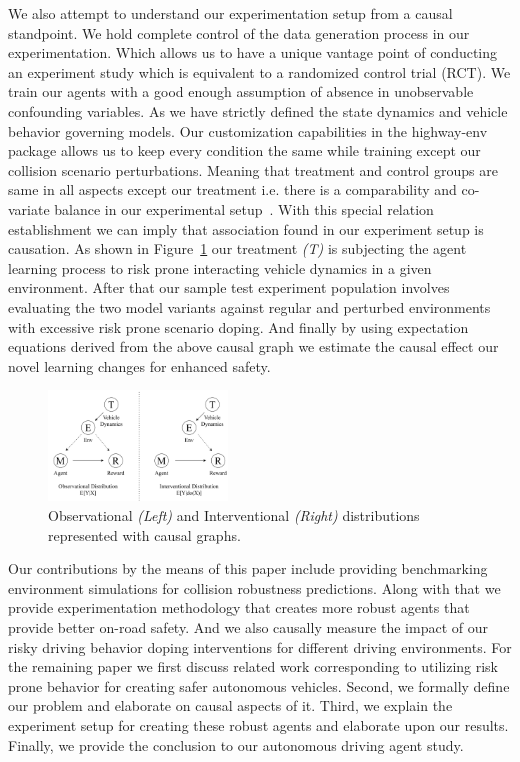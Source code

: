 \documentclass[a4, conference]{IEEEtran}
\begin{document}
    We also attempt to understand our experimentation setup from a causal standpoint. We hold complete control of the data generation process in our experimentation. Which allows us to have a unique vantage point of conducting an experiment study which is equivalent to a randomized control trial (RCT). We train our agents with a good enough assumption of absence in unobservable confounding variables. As we have strictly defined the state dynamics and vehicle behavior governing models. Our customization capabilities in the highway-env package allows us to keep every condition the same while training except our collision scenario perturbations. Meaning that treatment and control groups are same in all aspects except our treatment i.e. there is a comparability and co-variate balance in our experimental setup~\cite{pearl2009causal, pearl2018book, neuberg2003causality, holland1986statistics}. With this special relation establishment we can imply that association found in our experiment setup is causation. As shown in Figure~\ref{fig2} our treatment \textit{(T)} is subjecting the agent learning process to risk prone interacting vehicle dynamics in a given environment. After that our sample test experiment population involves evaluating the two model variants against regular and perturbed environments with excessive risk prone scenario doping. And finally by using expectation equations derived from the above causal graph we estimate the causal effect our novel learning changes for enhanced safety.

    \begin{figure}
        \centering
        \includegraphics[width=0.425\textwidth]{causal-graph-base.png}
        \caption{Observational \textit{(Left)} and Interventional \textit{(Right)} distributions represented with causal graphs.}
        \label{fig2}
    \end{figure}

    Our contributions by the means of this paper include providing benchmarking environment simulations for collision robustness predictions. Along with that we provide experimentation methodology that creates more robust agents that provide better on-road safety. And we also causally measure the impact of our risky driving behavior doping interventions for different driving environments. For the remaining paper we first discuss related work corresponding to utilizing risk prone behavior for creating safer autonomous vehicles. Second, we formally define our problem and elaborate on causal aspects of it. Third, we explain the experiment setup for creating these robust agents and elaborate upon our results. Finally, we provide the conclusion to our autonomous driving agent study.
\end{document}
